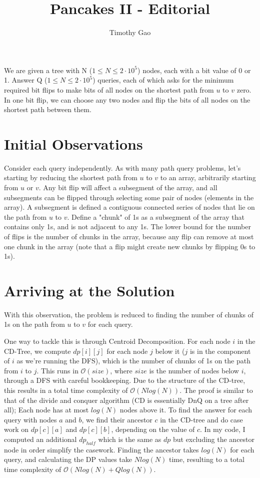 \documentclass[15pt]{article}
\title{Pancakes II - Editorial}
\author{Timothy Gao}
\date{}
\begin{document}
\maketitle

We are given a tree with N ($1 \leq N \leq 2 \cdot 10^5$) nodes, each with a bit value of 0 or 1. Answer Q ($1 \leq N \leq 2 \cdot 10^5$) queries, each of which asks for the minimum required bit flips to make bits of all nodes on the shortest path from $u$ to $v$ zero. In one bit flip, we can choose any two nodes and flip the bits of all nodes on the shortest path between them.

\section{Initial Observations}

Consider each query independently. As with many path query problems, let's starting by reducing the shortest path from $u$ to $v$ to an array, arbitrarily starting from $u$ or $v$. Any bit flip will affect a subsegment of the array, and all subsegments can be flipped through selecting some pair of nodes (elements in the array). A subsegment is defined a contiguous connected series of nodes that lie on the path from $u$ to $v$. Define a "chunk" of 1s as a subsegment of the array that contains only 1s, and is not adjacent to any 1s. The lower bound for the number of flips is the number of chunks in the array, because any flip can remove at most one chunk in the array (note that a flip might create new chunks by flipping 0s to 1s).

\section{Arriving at the Solution}

With this observation, the problem is reduced to finding the number of chunks of 1s on the path from $u$ to $v$ for each query.

One way to tackle this is through Centroid Decomposition. For each node $i$ in the CD-Tree, we compute $dp[i][j]$ for each node $j$ below it ($j$ is in the component of $i$ as we're running the DFS), which is the number of chunks of 1s on the path from $i$ to $j$. This runs in $\mathcal{O}(size)$, where $size$ is the number of nodes below $i$, through a DFS with careful bookkeeping. Due to the structure of the CD-tree, this results in a total time complexity of $\mathcal{O}(N log(N))$. The proof is similar to that of the divide and conquer algorithm (CD is essentially DnQ on a tree after all); Each node has at most $log(N)$ nodes above it. To find the answer for each query with nodes $a$ and $b$, we find their ancestor $c$ in the CD-tree and do case work on $dp[c][a]$ and $dp[c][b]$, depending on the value of $c$. In my code, I computed an additional $dp_{half}$ which is the same as $dp$ but excluding the ancestor node in order simplify the casework. Finding the ancestor takes $log(N)$ for each query, and calculating the DP values take $N log(N)$ time, resulting to a total time complexity of $\mathcal{O}(N log(N) + Q log(N))$.
\end{document}

